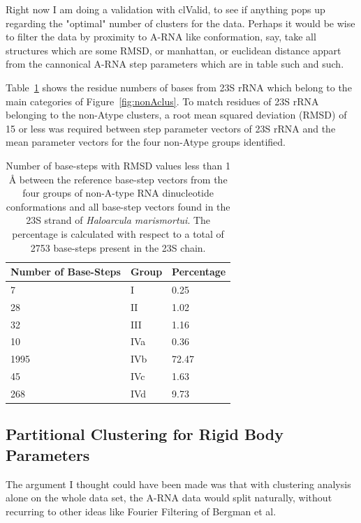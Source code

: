 Right now I am doing a validation with clValid, to see if anything
pops up regarding the "optimal" number of clusters for the data.
Perhaps it would be wise to filter the data by proximity to A-RNA like
conformation, say, take all structures which are some RMSD, or
manhattan, or euclidean distance appart from the cannonical A-RNA step
parameters which are in table such and such.


Table~\ref{tab:nonA}  shows  the
residue  numbers of  bases  from 23S  rRNA  which belong  to the  main
categories of Figure~\ref{fig:nonAclus}.   To match residues of
23S  rRNA belonging  to the  non-Atype  clusters, a  root mean  squared
deviation (RMSD)  of 15  or less was  required between  step parameter
vectors  of 23S  rRNA  and the  mean  parameter vectors  for the  four
non-Atype groups identified.
\begin{table}[htbp]
\begin{center}
{\footnotesize
\begin{tabular}{p{3cm}|p{}|p{3cm}}
\hline
\bf{Number of Base-Steps} & \bf{Group} & \bf{Percentage}\\ \hline
7    & I   & 0.25   \\ \hline
28   & II  & 1.02   \\ \hline
32   & III & 1.16   \\ \hline
10   & IVa & 0.36   \\ \hline
1995 & IVb & 72.47  \\ \hline
45   & IVc & 1.63   \\ \hline
268  & IVd & 9.73   \\ \hline
\end{tabular}
}
\caption{Number of base-steps  with RMSD values less than 1 \AA
between  the  reference base-step vectors  from  the  four groups  of
non-A-type  RNA dinucleotide conformations  and all  base-step vectors
found  in  the 23S  strand  of  \textit{Haloarcula marismortui}. The percentage is calculated with respect to a
total of 2753 base-steps present in the 23S chain.}
\label{tab:nonA}
\end{center}
\end{table}



%
%


\subsection{Partitional Clustering for Rigid Body Parameters}
The argument I thought could have been made was that with clustering
analysis alone on the whole data set, the A-RNA data would split
naturally, without recurring to other ideas like Fourier Filtering of
Bergman et al.

